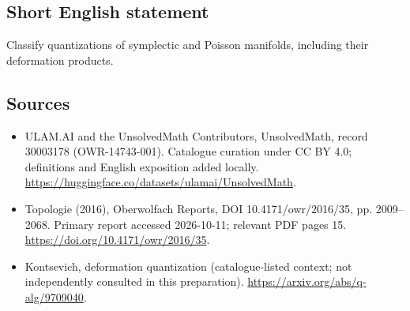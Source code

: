 \documentclass[11pt]{article}
\begin{document}
\subsection{Short English statement}
Classify quantizations of symplectic and Poisson manifolds, including their deformation products.
\subsection{Sources}
\begin{itemize}
\item[\hypertarget{source:30003178:1}{S1}] ULAM.AI and the UnsolvedMath Contributors, UnsolvedMath, record 30003178 (OWR-14743-001). Catalogue curation under CC BY 4.0; definitions and English exposition added locally.
\url{https://huggingface.co/datasets/ulamai/UnsolvedMath}.
\item[\hypertarget{source:30003178:2}{S2}] Topologie (2016), Oberwolfach Reports, DOI 10.4171/owr/2016/35, pp. 2009--2068. Primary report accessed 2026-10-11; relevant PDF pages 15.
\url{https://doi.org/10.4171/owr/2016/35}.
\item[\hypertarget{source:30003178:3}{S3}] Kontsevich, deformation quantization (catalogue-listed context; not independently consulted in this preparation).
\url{https://arxiv.org/abs/q-alg/9709040}.
\end{itemize}
\label{end:30003178}
\end{document}
